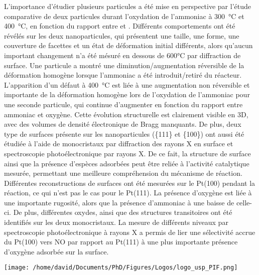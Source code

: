 \begin{mdframed}[linecolor=Prune,linewidth=1]
\begin{multicols}{2}
L'importance d'étudier plusieurs particules a été mise en perspective par l'étude comparative de deux particules durant l'oxydation de l'ammoniac à \qty{300}{\degreeCelsius} et \qty{400}{\degreeCelsius}, en fonction du rapport entre  et .
Différents comportements ont été révélés sur les deux nanoparticules, qui présentent une taille, une forme, une couverture de facettes et un état de déformation initial différents, alors qu'aucun important changement n'a été mésuré en dessous de 600°C par diffraction de surface.
Une particule a montré une diminution/augmentation réversible de la déformation homogène lorsque l'ammoniac a été introduit/retiré du réacteur.
L'apparition d'un défaut à \qty{400}{\degreeCelsius} est liée à une augmentation non réversible et importante de la déformation homogène lors de l'oxydation de l'ammoniac pour une seconde particule, qui continue d'augmenter en fonction du rapport entre ammoniac et oxygène.
Cette évolution structurelle est clairement visible en 3D, avec des volumes de densité électronique de Bragg manquants.
De plus, deux type de surfaces présente sur les nanoparticules (\{111\} et \{100\}) ont aussi été étudiée à l'aide de monocristaux par diffraction des rayons X en surface et spectroscopie photoélectronique par rayons X.
De ce fait, la structure de surface ainsi que la présence d'espèces adsorbées peut être reliée à l'activité catalytique mesurée, permettant une meilleure compréhension du mécanisme de réaction.
Différentes reconstructions de surfaces ont été mesurées sur le Pt(100) pendant la réaction, ce qui n'est pas le cas pour le Pt(111).
La présence d'oxygène est liée à une importante rugosité, alors que la présence d'ammoniac à une baisse de celle-ci.
De plus, différentes oxydes, ainsi que des structures transitoires ont été identifiés sur les deux monocristaux.
La mesure de différents niveaux par spectroscopie photoélectronique à rayons X a permis de lier une sélectivité accrue du Pt(100) vers NO par rapport au Pt(111) à une plus importante présence d'oxygène adsorbée sur la surface.
\end{multicols}

\end{mdframed}

\newpage
\thispagestyle{empty}

\lhead{}
\rhead{}
\rfoot{}
\cfoot{}
\lfoot{}

\noindent
\texttt{[image: /home/david/Documents/PhD/Figures/Logos/logo\_usp\_PIF.png]}
\vspace{0.5cm}

